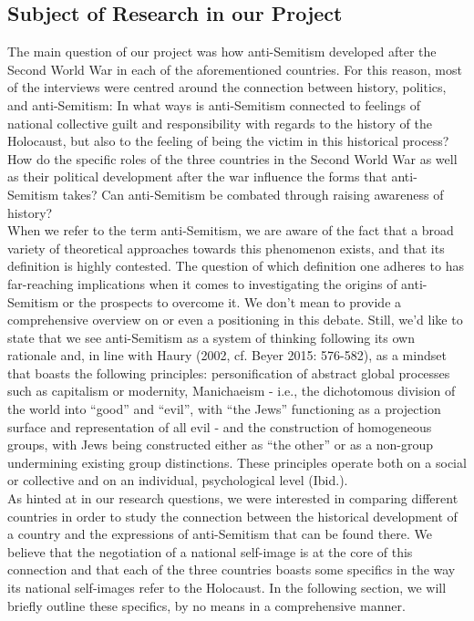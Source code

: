 \subsection*{Subject of Research in our Project}
The main question of our project was how anti-Semitism developed after the Second World War in each of the aforementioned countries. For this reason, most of the interviews were centred around the connection between history, politics, and anti-Semitism: In what ways is anti-Semitism connected to feelings of national collective guilt and responsibility with regards to the history of the Holocaust, but also to the feeling of being the victim in this historical process? How do the specific roles of the three countries in the Second World War as well as their political development after the war influence the forms that anti-Semitism takes? Can anti-Semitism be combated through raising awareness of history? \\
When we refer to the term anti-Semitism, we are aware of the fact that a broad variety of theoretical approaches towards this phenomenon exists, and that its definition is highly contested. The question of which definition one adheres to has far-reaching implications when it comes to investigating the origins of anti-Semitism or the prospects to overcome it. We don't mean to provide a comprehensive overview on or even a positioning in this debate. Still, we'd like to state that we see anti-Semitism as a system of thinking following its own rationale and, in line with Haury (2002, cf. Beyer 2015: 576-582), as a mindset that boasts the following principles: personification of abstract global processes such as capitalism or modernity, Manichaeism - i.e., the dichotomous division of the world into ``good'' and ``evil'', with ``the Jews'' functioning as a projection surface and representation of all evil - and the construction of homogeneous groups, with Jews being constructed either as ``the other'' or as a non-group undermining existing group distinctions. These principles operate both on a social or collective and on an individual, psychological level (Ibid.).\\
As hinted at in our research questions, we were interested in comparing different countries in order to study the connection between the historical development of a country and the expressions of anti-Semitism that can be found there. We believe that the negotiation of a national self-image is at the core of this connection and that each of the three countries boasts some specifics in the way its national self-images refer to the Holocaust. In the following section, we will briefly outline these specifics, by no means in a comprehensive manner. \par
